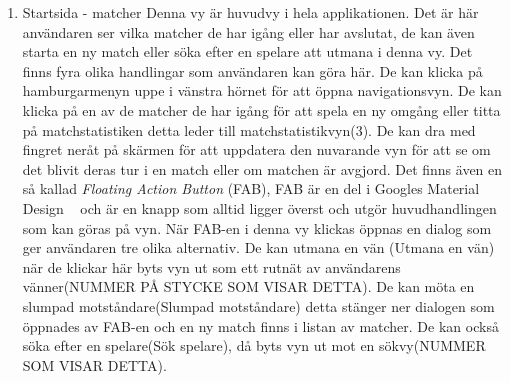 \documentclass[a4paper, 11pt]{article}
\begin{document}
\begin{enumerate}
\pagebreak
\item \large \textup{Startsida - matcher}
\linebreak
Denna vy är huvudvy i hela applikationen. Det är här användaren ser vilka matcher de har igång eller har avslutat, de kan även starta en ny match eller söka efter en spelare att utmana i denna vy. Det finns fyra olika handlingar som användaren kan göra här. De kan klicka på hamburgarmenyn uppe i vänstra hörnet för att öppna navigationsvyn. De kan klicka på en av de matcher de har igång för att spela en ny omgång eller titta på matchstatistiken detta leder till matchstatistikvyn(3). De kan dra med fingret neråt på skärmen för att uppdatera den nuvarande vyn för att se om det blivit deras tur i en match eller om matchen är avgjord. Det finns även en så kallad \textit{Floating Action Button} (FAB), FAB är en del i Googles Material Design ~\cite{MaterialDesign} och är en knapp som alltid ligger överst och utgör huvudhandlingen som kan göras på vyn. När FAB-en i denna vy klickas öppnas en dialog som ger användaren tre olika alternativ. De kan utmana en vän (Utmana en vän) när de klickar här byts vyn ut som ett rutnät av användarens vänner(NUMMER PÅ STYCKE SOM VISAR DETTA). De kan möta en slumpad motståndare(Slumpad motståndare) detta stänger ner dialogen som öppnades av FAB-en och en ny match finns i listan av matcher. De kan också söka efter en spelare(Sök spelare), då byts vyn ut mot en sökvy(NUMMER SOM VISAR DETTA). 


\end{enumerate}
\end{document}
